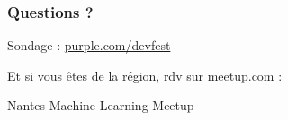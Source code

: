 \documentclass[t]{beamer}
\begin{document}

\begin{frame}
  \frametitle{Questions ?}

  \vspace{1cm}
  \centerline{Sondage : \url{purple.com/devfest}}

  \vspace{1cm}
  \centerline{Et si vous êtes de la région, rdv sur meetup.com :}

  \bigskip
  \centerline{Nantes Machine Learning Meetup}
\end{frame}
\end{document}
